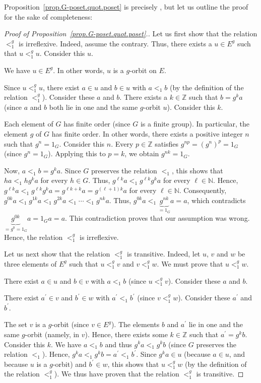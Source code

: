 \documentclass[12pt]{article}
\theoremstyle{plain}
\theoremstyle{definition}
\theoremstyle{remark}
\newcommand{\NN}{{\mathbb{N}}}
\newcommand{\ZZ}{{\mathbb{Z}}}
\begin{document}
Proposition~\ref{prop.G-poset.quot.poset} is precisely \cite[Lemma 2.4]{Joch},
but let us outline the proof for the sake of completeness:

\begin{proof}[Proof of Proposition~\ref{prop.G-poset.quot.poset}.]
Let us first show that the relation $<_{1}^{g}$ is irreflexive.
Indeed, assume the contrary. Thus, there exists a $u \in E^g$
such that $u <_1^g u$. Consider this $u$.

We have $u \in E^g$. In other words, $u$ is a $g$-orbit on $E$.

Since $u<_{1}^{g}u$, there exist $a\in u$ and $b\in u$ with
$a<_{1}b$ (by the definition of the relation $<_{1}^{g}$).
Consider these $a$ and $b$. There exists a $k\in\mathbb{Z}$ such
that $b=g^{k}a$ (since $a$ and $b$ both lie in one and the same $g$-orbit
$u$). Consider this $k$.

Each element of $G$ has finite order (since $G$ is a finite group).
In particular, the element $g$ of $G$ has finite order. In other words,
there exists a positive integer $n$ such that $g^{n}=1_G$.
Consider this $n$. Every $p \in \ZZ$ satisfies $g^{np}=\left(
g^{n}\right)  ^{p}=1_G$ (since $g^{n}=1_G$).
Applying this to $p=k$, we obtain $g^{nk}=1_G$.

Now, $a<_{1}b=g^{k}a$. Since $G$ preserves the relation $<_{1}$, this shows
that $ha<_{1}hg^{k}a$ for every $h\in G$.
Thus, $g^{\ell k}a<_{1}g^{\ell k}g^{k}a$ for every $\ell\in \NN $.
Hence,
$g^{\ell k} a <_{1} g^{\ell k} g^{k} a
= g^{\ell k + k} a = g^{\left(  \ell+1\right)  k} a$
for every $\ell\in \NN $.
Consequently, $g^{0k}a<_{1}g^{1k}a<_{1}g^{2k}a<_{1}\cdots<_{1}g^{nk}a$. Thus,
$g^{0k}a<_{1}\underbrace{g^{nk}}_{=1_G}a=a$, which
contradicts $\underbrace{g^{0k}}_{=g^0=1_G}a=1_Ga=a$.
This contradiction proves that our assumption was
wrong. Hence, the relation $<_{1}^{g}$ is irreflexive.

Let us next show that the relation $<_{1}^{g}$ is transitive. Indeed, let $u$,
$v$ and $w$ be three elements of $E^{g}$ such that $u<_{1}^{g}v$ and
$v<_{1}^{g}w$. We must prove that $u<_{1}^{g}w$.

There exist $a\in u$ and $b\in v$ with $a<_{1}b$ (since $u<_{1}^{g}v$).
Consider these $a$ and $b$.

There exist $a^{\prime}\in v$ and $b^{\prime}\in w$ with $a^{\prime}
<_{1}b^{\prime}$ (since $v<_{1}^{g}w$). Consider these $a^{\prime}$ and
$b^{\prime}$.

The set $v$ is a $g$-orbit (since $v \in E^g$).
The elements $b$ and $a^{\prime}$ lie in one and the same $g$-orbit (namely,
in $v$). Hence, there exists some $k\in\mathbb{Z}$ such that $a^{\prime}
=g^{k}b$. Consider this $k$. We have $a<_{1}b$ and thus $g^{k}a<_{1}g^{k}b$
(since $G$ preserves the relation $<_{1}$). Hence,
$g^{k}a<_{1}g^{k}b=a^{\prime}<_{1}b^{\prime}$.
Since $g^{k}a\in u$ (because $a\in u$, and because $u$ is a
$g$-orbit) and $b^{\prime}\in w$, this shows that $u<_{1}^{g}w$
(by the definition of the relation $<_{1}^{g}$).
We thus have proven that the
relation $<_{1}^{g}$ is transitive.


\end{proof}
\end{document}
